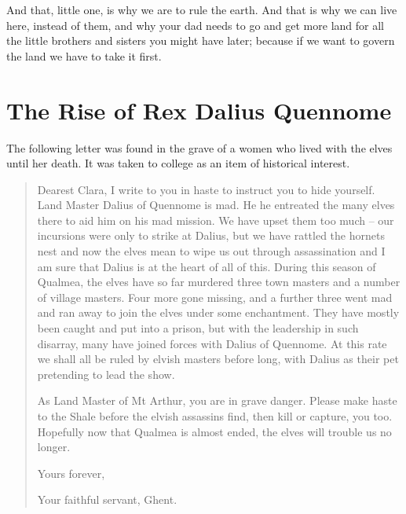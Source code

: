 \begin{multicols}{2}
\begin{exampletext}
And that, little one, is why we are to rule the earth.
And that is why we can live here, instead of them, and why your dad needs to go and get more land for all the little brothers and sisters you might have later; because if we want to govern the land we have to take it first.

\end{exampletext}

\end{multicols}

\section{The Rise of Rex Dalius Quennome}

\begin{multicols}{2}
\label{h_dalius}

\noindent The following letter was found in the grave of a women who lived with the elves until her death.
It was taken to \gls{college} as an item of historical interest.

\begin{quotation}

	Dearest Clara, I write to you in haste to instruct you to hide yourself.
	Land Master Dalius of Quennome is mad.
	He he entreated the many elves there to aid him on his mad mission.
	We have upset them too much -- our incursions were only to strike at Dalius, but we have rattled the hornets nest and now the elves mean to wipe us out through assassination and I am sure that Dalius is at the heart of all of this.
	During this season of Qualmea, the elves have so far murdered three town masters and a number of village masters.
	Four more gone missing, and a further three went mad and ran away to join the elves under some enchantment.
	They have mostly been caught and put into a prison, but with the leadership in such disarray, many have joined forces with Dalius of Quennome.
	At this rate we shall all be ruled by elvish masters before long, with Dalius as their pet pretending to lead the show.

	As Land Master of Mt Arthur, you are in grave danger.
	Please make haste to the Shale before the elvish assassins find, then kill or capture, you too.
	Hopefully now that Qualmea is almost ended, the elves will trouble us no longer.

	Yours forever,

	Your faithful servant, Ghent.

\end{quotation}


\end{multicols}

